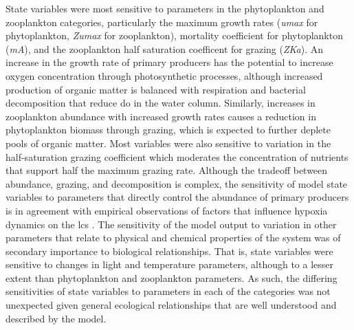 \documentclass[preprint]{elsarticle}\usepackage[]{graphicx}\usepackage[]{color}
\begin{document}
State variables were most sensitive to parameters in the phytoplankton and zooplankton categories, particularly the maximum growth rates (\textit{umax} for phytoplankton, \textit{Zumax} for zooplankton), mortality coefficient for phytoplankton (\textit{mA}), and the zooplankton half saturation coefficent for grazing (\textit{ZKa}). An increase in the growth rate of primary producers has the potential to increase oxygen concentration through photosynthetic processes, although increased production of organic matter is balanced with respiration and bacterial decomposition that reduce \ac{do} in the water column.  Similarly, increases in zooplankton abundance with increased growth rates causes a reduction in phytoplankton biomass through grazing, which is expected to further deplete pools of organic matter.  Most variables were also sensitive to variation in the half-saturation grazing coefficient which moderates the concentration of nutrients that support half the maximum grazing rate. Although the tradeoff between abundance, grazing, and decomposition is complex, the sensitivity of model state variables to parameters that directly control the abundance of primary producers is in agreement with empirical observations of factors that influence hypoxia dynamics on the \ac{lcs} \citep{Fahnenstiel95,Roelke00,Eldridge10}. The sensitivity of the model output to variation in other parameters that relate to physical and chemical properties of the system was of secondary importance to biological relationships.  That is, state variables were sensitive to changes in light and temperature parameters, although to a lesser extent than phytoplankton and zooplankton parameters.  As such, the differing sensitivities of state variables to parameters in each of the categories was not unexpected given general ecological relationships that are well understood and described by the model.    
\end{document}
